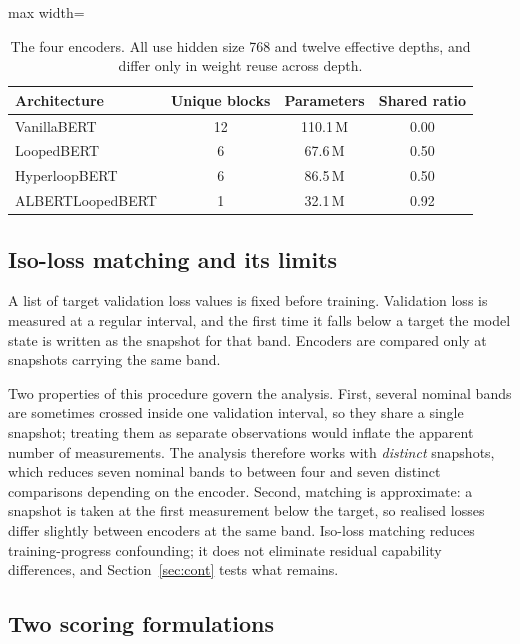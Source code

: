 \documentclass[sigconf,natbib=true,anonymous=true]{acmart}
\begin{document}
\begin{table}[t]
\centering
\caption{The four encoders. All use hidden size 768 and twelve effective depths,
and differ only in weight reuse across depth.}
\label{tab:arch}
\small
\begin{adjustbox}{max width=\columnwidth}
\begin{tabular}{lccc}
\toprule
Architecture & Unique blocks & Parameters & Shared ratio \\
\midrule
VanillaBERT       & 12 & 110.1\,M & 0.00 \\
LoopedBERT        &  6 &  67.6\,M & 0.50 \\
HyperloopBERT     &  6 &  86.5\,M & 0.50 \\
ALBERTLoopedBERT  &  1 &  32.1\,M & 0.92 \\
\bottomrule
\end{tabular}
\end{adjustbox}
\end{table}

\subsection{Iso-loss matching and its limits}

A list of target validation loss values is fixed before training. Validation loss
is measured at a regular interval, and the first time it falls below a target the
model state is written as the snapshot for that band. Encoders are compared only
at snapshots carrying the same band.

Two properties of this procedure govern the analysis. First, several nominal
bands are sometimes crossed inside one validation interval, so they share a
single snapshot; treating them as separate observations would inflate the
apparent number of measurements. The analysis therefore works with
\emph{distinct} snapshots, which reduces seven nominal bands to between four and
seven distinct comparisons depending on the encoder. Second, matching is
approximate: a snapshot is taken at the first measurement below the target, so
realised losses differ slightly between encoders at the same band. Iso-loss
matching reduces training-progress confounding; it does not eliminate residual
capability differences, and Section~\ref{sec:cont} tests what remains.

\subsection{Two scoring formulations}
\end{document}
